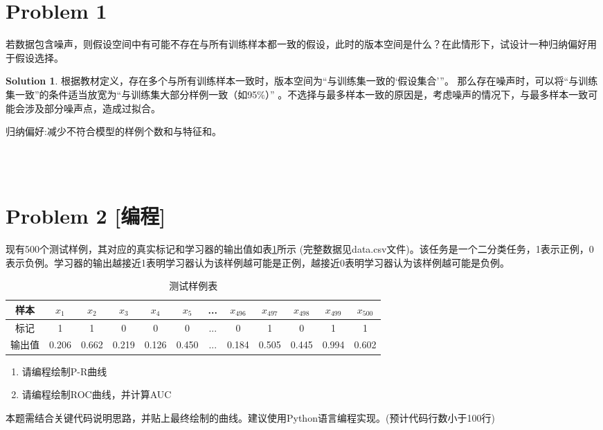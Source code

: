 \documentclass[a4paper,UTF8]{article}
\theoremstyle{definition}
\newtheorem*{solution}{Solution}
\begin{document}
\newpage
\section*{Problem 1}
若数据包含噪声，则假设空间中有可能不存在与所有训练样本都一致的假设，此时的版本空间是什么？在此情形下，试设计一种归纳偏好用于假设选择。
\begin{solution}
\phantom{abc}

根据教材定义，存在多个与所有训练样本一致时，版本空间为“与训练集一致的‘假设集合’”。
那么存在噪声时，可以将“与训练集一致”的条件适当放宽为“与训练集大部分样例一致（如95\%）” 。不选择与最多样本一致的原因是，考虑噪声的情况下，与最多样本一致可能会涉及部分噪声点，造成过拟合。

归纳偏好:减少不符合模型的样例个数和与特征和。

~\\
~\\
\end{solution}

\section*{Problem 2 [编程]} 
现有500个测试样例，其对应的真实标记和学习器的输出值如表\ref{table:roc}所示 (完整数据见data.csv文件)。该任务是一个二分类任务，1表示正例，0表示负例。学习器的输出越接近1表明学习器认为该样例越可能是正例，越接近0表明学习器认为该样例越可能是负例。
\begin{table}[!h]
	\centering
	\caption{测试样例表} \vspace{2mm}\label{table:roc}
	\begin{tabular}{c|c c c c c c c c c c c}\hline
		样本 & $x_1$ & $x_2$ & $x_3$  & $x_4$  & $x_5$&...& $x_{496}$& $x_{497}$ & $x_{498}$ & $x_{499}$ & $x_{500}$ \\
		\hline
		标记 & 1  & 1 &  0 &  0  & 0 &... &0& 1 & 0 & 1 & 1\\
		\hline
		输出值 & 0.206  & 0.662 &  0.219 &  0.126  & 0.450 & ... & 0.184&0.505 & 0.445 & 0.994 & 0.602\\
		\hline
	\end{tabular}
\end{table}
\begin{enumerate}[ {(}1{)}]
\item 请编程绘制P-R曲线
\item 请编程绘制ROC曲线，并计算AUC
\end{enumerate}
本题需结合关键代码说明思路，并贴上最终绘制的曲线。建议使用Python语言编程实现。(预计代码行数小于100行)
\end{document}
